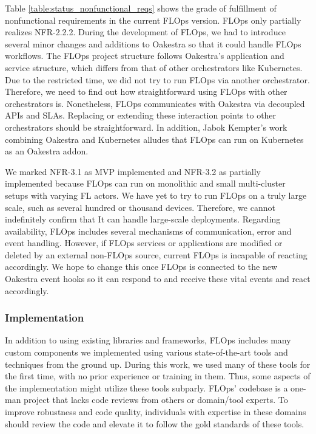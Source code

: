 Table \ref{table:status_nonfunctional_reqs} shows the grade of fulfillment of nonfunctional requirements in the current FLOps version.
FLOps only partially realizes NFR-2.2.2.
During the development of FLOps, we had to introduce several minor changes and additions to Oakestra so that it could handle FLOps workflows.
The FLOps project structure follows Oakestra's application and service structure, which differs from that of other orchestrators like Kubernetes.
Due to the restricted time, we did not try to run FLOps via another orchestrator.
Therefore, we need to find out how straightforward using FLOps with other orchestrators is.
Nonetheless, FLOps communicates with Oakestra via decoupled APIs and SLAs.
Replacing or extending these interaction points to other orchestrators should be straightforward.
In addition, Jabok Kempter's work combining Oakestra and Kubernetes \cite{thesis:tum_jakob_kempter_kubernetes_oakestra} alludes that FLOps can run on Kubernetes as an Oakestra addon.

We marked NFR-3.1 as MVP implemented and NFR-3.2 as partially implemented because FLOps can run on monolithic and small multi-cluster setups with varying FL actors.
We have yet to try to run FLOps on a truly large scale, such as several hundred or thousand devices.
Therefore, we cannot indefinitely confirm that It can handle large-scale deployments.
Regarding availability, FLOps includes several mechanisms of communication, error and event handling.
However, if FLOps services or applications are modified or deleted by an external non-FLOps source, current FLOps is incapable of reacting accordingly.
We hope to change this once FLOps is connected to the new Oakestra event hooks \cite{thesis:tum_mahmoud} so it can respond to and receive these vital events and react accordingly.


\subsubsection{Implementation}
In addition to using existing libraries and frameworks, FLOps includes many custom components we implemented using various state-of-the-art tools and techniques from the ground up.
During this work, we used many of these tools for the first time, with no prior experience or training in them.
Thus, some aspects of the implementation might utilize these tools subparly.
FLOps' codebase is a one-man project that lacks code reviews from others or domain/tool experts.
To improve robustness and code quality, individuals with expertise in these domains should review the code and elevate it to follow the gold standards of these tools.

